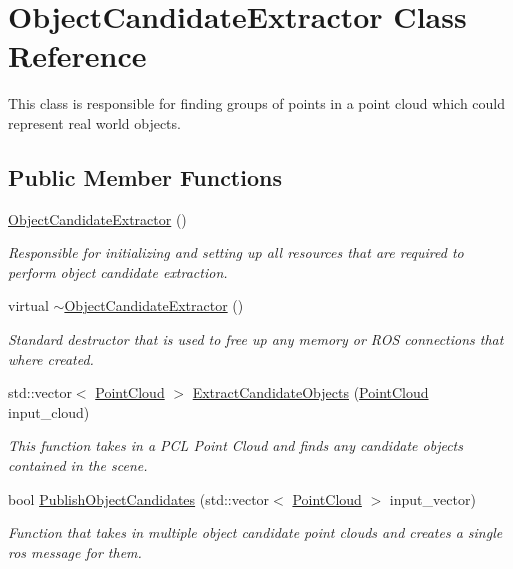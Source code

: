 \hypertarget{class_object_candidate_extractor}{\section{\-Object\-Candidate\-Extractor \-Class \-Reference}
\label{class_object_candidate_extractor}
}


\-This class is responsible for finding groups of points in a point cloud which could represent real world objects.  


\subsection*{\-Public \-Member \-Functions}
\begin{DoxyCompactItemize}
\item 
\hyperlink{class_object_candidate_extractor_a41916df0d27e926a337fff6e7e762010}{\-Object\-Candidate\-Extractor} ()
\begin{DoxyCompactList}\small\item\em \-Responsible for initializing and setting up all resources that are required to perform object candidate extraction. \end{DoxyCompactList}\item 
virtual \hyperlink{class_object_candidate_extractor_ad1aa824172a7d2e6002d5d7e3104d5d3}{$\sim$\-Object\-Candidate\-Extractor} ()
\begin{DoxyCompactList}\small\item\em \-Standard destructor that is used to free up any memory or \-R\-O\-S connections that where created. \end{DoxyCompactList}\item 
std\-::vector$<$ \hyperlink{_helper_functions_8h_abb956d1047f4dd2c956fe3cb0dd0004d}{\-Point\-Cloud} $>$ \hyperlink{class_object_candidate_extractor_a6a4adbcec19f94bc6073a4b2c2fa6f66}{\-Extract\-Candidate\-Objects} (\hyperlink{_helper_functions_8h_abb956d1047f4dd2c956fe3cb0dd0004d}{\-Point\-Cloud} input\-\_\-cloud)
\begin{DoxyCompactList}\small\item\em \-This function takes in a \-P\-C\-L \-Point \-Cloud and finds any candidate objects contained in the scene. \end{DoxyCompactList}\item 
bool \hyperlink{class_object_candidate_extractor_ab8848f6d86f7d7798ea30c2e04ae8b59}{\-Publish\-Object\-Candidates} (std\-::vector$<$ \hyperlink{_helper_functions_8h_abb956d1047f4dd2c956fe3cb0dd0004d}{\-Point\-Cloud} $>$ input\-\_\-vector)
\begin{DoxyCompactList}\small\item\em \-Function that takes in multiple object candidate point clouds and creates a single ros message for them. \end{DoxyCompactList}\end{DoxyCompactItemize}
